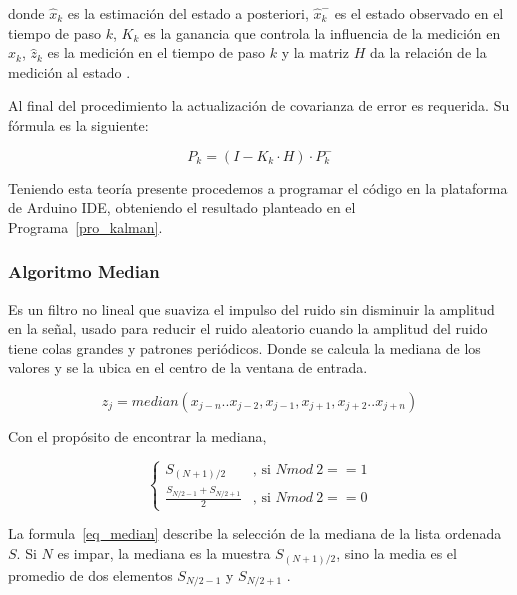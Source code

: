 \documentclass[10pt,a4paper]{article}
\begin{document}
donde $\hat{x}_{k}$ es la estimación del estado a posteriori, $\hat{x}^{-}_{k}$ es el estado observado en el tiempo de paso $k$, $K_{k}$ es la ganancia que controla la influencia de la medición en $\hat{x}_{k}$, $\hat{z}_{k}$ es la medición en el tiempo de paso $k$ y la matriz $H$ da la relación de la medición al estado \cite{Kowalski2018}.

Al final del procedimiento la actualización de covarianza de error es requerida. Su fórmula es la siguiente:
 
\begin{equation}
P_{k} = (I - K_{k} \cdot H) \cdot P^{-}_{k}
\end{equation}

Teniendo esta teoría presente procedemos a programar el código en la plataforma de Arduino IDE, obteniendo el resultado planteado en el Programa~\ref{pro_kalman}.



\subsubsection{Algoritmo Median}
Es un filtro no lineal que suaviza el impulso del ruido sin disminuir la amplitud en la señal, usado para reducir el ruido aleatorio cuando la amplitud del ruido tiene colas grandes y patrones periódicos. Donde se calcula la mediana de los valores y se la ubica en el centro de la ventana de entrada.

\begin{equation}
z_{j} = median(x_{j-n} .. x_{j-2}, x_{j-1}, x_{j+1}, x_{j+2} .. x_{j+n})
\end{equation}

Con el propósito de encontrar la mediana, 

\begin{equation}\label{eq_median}
\left \{ \begin{matrix} S_{(N+1)/2} & \mbox{, si }N mod \ 2 == 1\\
\displaystyle\frac{S_{N/2-1}+ S_{N/2+1}}{2} & \mbox{, si }N mod \ 2==0\end{matrix}\right.
\end{equation}

La formula~\ref{eq_median} describe la selección de la mediana de la lista ordenada $S$. Si $N$ es impar, la mediana es la muestra $S_{(N+1)/2}$, sino la media es el promedio de dos elementos $S_{N/2-1}$ y $S_{N/2+1}$ \cite{Kowalski2018}.\\
\end{document}
